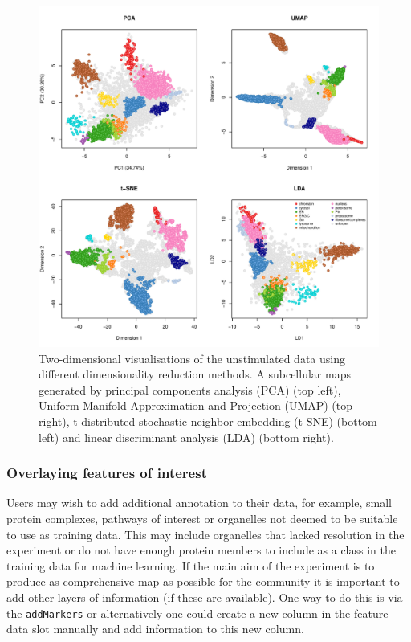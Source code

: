 \documentclass[9pt,a4paper,]{extarticle}
\begin{document}
\begin{figure}[H]

{\centering \includegraphics[width=1\linewidth,]{figs/svm_maps} 

}

\caption{Two-dimensional visualisations of the unstimulated data using different dimensionality reduction methods. A subcellular maps generated by principal components analysis (PCA) (top left), Uniform Manifold Approximation and Projection (UMAP) (top right), t-distributed stochastic neighbor embedding (t-SNE) (bottom left) and linear discriminant analysis (LDA) (bottom right).}\label{fig:svm-maps}
\end{figure}

\subsubsection{Overlaying features of interest}\label{overlaying-features-of-interest}

Users may wish to add additional annotation to their data, for example, small
protein complexes, pathways of interest or organelles not deemed to be suitable
to use as training data. This may include organelles that lacked resolution in
the experiment or do not have enough protein members to include as a class in
the training data for machine learning. If the main aim of the experiment is to
produce as comprehensive map as possible for the community it is important to
add other layers of information (if these are available). One way to do this is
via the \texttt{addMarkers} or alternatively one could create a new column in the
feature data slot manually and add information to this new column.
\end{document}
